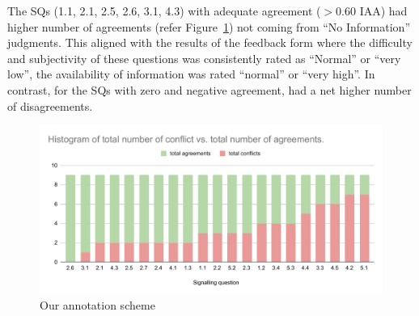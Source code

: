 \documentclass[sn-mathphys,Numbered]{sn-jnl}%
\theoremstyle{thmstyleone}%
\theoremstyle{thmstyletwo}%
\theoremstyle{thmstylethree}%
\begin{document}
The SQs (1.1, 2.1, 2.5, 2.6, 3.1, 4.3) with adequate agreement ($>0.60$ IAA) had higher number of agreements (refer Figure~\ref{fig:pabakagreement}) not coming from ``No Information'' judgments.
This aligned with the results of the feedback form where the difficulty and subjectivity of these questions was consistently rated as ``Normal'' or ``very low'', the availability of information was rated ``normal'' or ``very high''.
In contrast, for the SQs with zero and negative agreement, had a net higher number of disagreements.


%
%
%
\begin{figure}
    \centering
    \includegraphics[width=0.99\columnwidth]{figures/agreements.pdf}
    \caption{Our annotation scheme}
    \label{fig:pabakagreement}
\end{figure}
%
%
%

%
%
%
\end{document}
